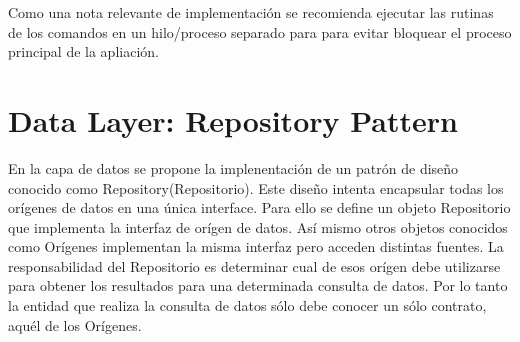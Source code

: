 Como una nota relevante de implementación se recomienda ejecutar las rutinas de los comandos en un hilo/proceso separado para para evitar bloquear el proceso principal de la apliación.



\section{Data Layer: Repository Pattern}
En la capa de datos se propone la implenentación de un patrón de diseño conocido como Repository(Repositorio). Este diseño intenta encapsular todas los orígenes de datos en una única interface. Para ello se define un objeto Repositorio que implementa la interfaz de orígen de datos. Así mismo otros objetos conocidos como Orígenes implementan la misma interfaz pero acceden distintas fuentes. La responsabilidad del Repositorio es determinar cual de esos orígen debe utilizarse para obtener los resultados para una determinada consulta de datos.
Por lo tanto la entidad que realiza la consulta de datos sólo debe conocer un sólo contrato, aquél de los Orígenes.
% 
